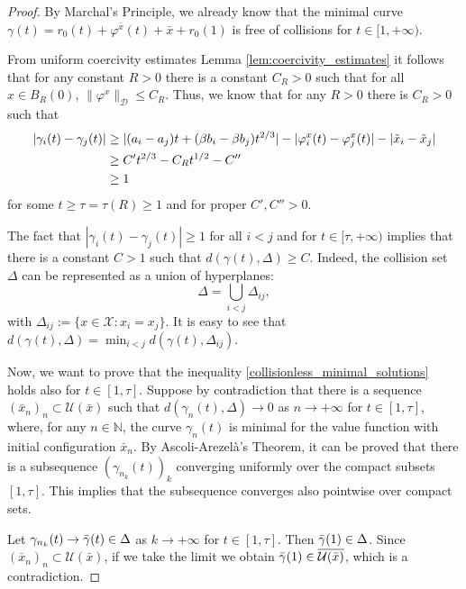 \documentclass[a4paper,10pt]{amsart}
\newcommand{\numberset}{\mathbb}
\newcommand{\N}{\numberset{N}}
\theoremstyle{plain}
\theoremstyle{definition}
\numberwithin{equation}{section}
\numberwithin{thm}{section}
\begin{document}
\begin{proof}
    By Marchal's Principle, we already know that the minimal curve $\gamma(t) = r_0(t) + \varphi^{\bar x}(t) + \bar x + r_0(1)$ is free of collisions for $t\in[1,+\infty)$.

    From uniform coercivity estimates Lemma \ref{lem:coercivity_estimates} it follows that for any constant $R>0$ there is a constant $C_R>0$ such that for all $x\in B_R(0)$, $\|\varphi^{x}\|_\mathcal{D}\leq C_R$. Thus, we know that for any $R>0$ there is $C_R>0$ such that
    \begin{displaymath}
        \begin{split}
            |\gamma_i(t) - \gamma_j(t)| &\geq |(a_i-a_j)t + (\beta b_i - \beta b_j)t^{2/3}| - |\varphi_i^{ x}(t) - \varphi_j^{ x}(t)| - |\Tilde{ x}_i - \Tilde{ x}_j| \\
            & \geq C' t^{2/3} - C_R t^{1/2} - C'' \\
            & \geq 1
        \end{split}
    \end{displaymath}
    for some $t\geq \tau=\tau(R)\geq1$ and for proper $C',C''>0$.
    
    The fact that $|\gamma_i(t) - \gamma_j(t)| \geq1$ for all $i<j$ and for $t\in[\tau,+\infty)$ implies that there is a constant $C>1$ such that $d(\gamma(t),\Delta)\geq C$. Indeed, the collision set $\Delta$ can be represented as a union of hyperplanes:
    \[
    \Delta = \bigcup_{i<j} \Delta_{ij},
    \]
    with $\Delta_{ij}:=\{ x\in\mathcal{X} : x_i = x_j\}$. It is easy to see that $d(\gamma(t),\Delta) = \min_{i<j} d(\gamma(t),\Delta_{ij})$.

    Now, we want to prove that the inequality \eqref{collisionless_minimal_solutions} holds also for $t\in[1,\tau]$. Suppose by contradiction that there is a sequence $({\bar x}_n)_n\subset \mathcal{U}(\bar x)$ such that $d(\gamma_n(t),\Delta)\rightarrow0$ as $n\rightarrow+\infty$ for $t\in[1,\tau]$, where, for any $n\in\N$, the curve $\gamma_n(t)$ is minimal for the value function with initial configuration ${\bar x}_n$. By Ascoli-Arezelà's Theorem, it can be proved that there is a subsequence $(\gamma_{n_k}(t))_k$ converging uniformly over the compact subsets $[1,\tau]$. This implies that the subsequence converges also pointwise over compact sets. 
    
    Let $\gamma_{n_k}(t)\rightarrow\Bar{\gamma}(t)\in\Delta$ as $k\rightarrow+\infty$ for $t\in[1,\tau]$. Then $\Bar{\gamma}(1)\in\Delta$. Since $({\bar x}_n)_n\subset \mathcal{U}(\bar x)$, if we take the limit we obtain $\Bar{\gamma}(1)\in \overline{\mathcal{U}(\bar x)}$, which is a contradiction. 
\end{proof}
\end{document}
